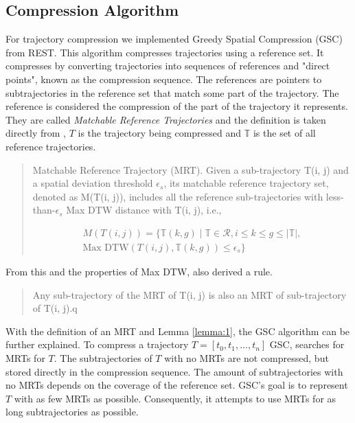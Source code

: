 \subsection{Compression Algorithm}
For trajectory compression we implemented Greedy Spatial Compression (GSC) from REST. This algorithm compresses trajectories using a reference set. It compresses by converting trajectories into sequences of references and "direct points", known as the compression sequence. The references are pointers to subtrajectories in the reference set that match some part of the trajectory. The reference is considered the compression of the part of the trajectory it represents. They are called \textit{Matchable Reference Trajectories} and the definition is taken directly from \textcite{zhao2018rest}, $T$ is the trajectory being compressed and $\mathbb{T}$ is the set of all reference trajectories.
\\
\begin{quote}
    \begin{definition}
        \label{def:mrt}
        Matchable Reference Trajectory (MRT). Given a sub-trajectory T(i, j) and a spatial deviation threshold $\epsilon_{s}$, its matchable reference trajectory set, denoted as M(T(i, j)), includes all the reference sub-trajectories with less-than-$\epsilon_{s}$ Max DTW distance with T(i, j), i.e.,
    \end{definition}
    \begin{equation}\label{eq:mrt}
        \begin{aligned}
            M(T(i,j)) = \{ \mathbb{T}(k,g) \mid \mathbb{T} \in \mathcal{R}, i \leq k \leq g \leq \left\lvert \mathbb{T} \right\rvert, \\
            \text{Max DTW}(T(i,j), \mathbb{T}(k,g)) \leq \epsilon_{s} \}
        \end{aligned}
    \end{equation}
\end{quote}

From this and the properties of Max DTW, \textcite{zhao2018rest} also derived a rule.

\begin{quote}
    \begin{lemma}\label{lemma:1}
        Any sub-trajectory of the MRT of T(i, j) is also an MRT of sub-trajectory of T(i, j).q
    \end{lemma}
\end{quote}


With the definition of an MRT and Lemma \ref{lemma:1}, the GSC algorithm can be further explained. To compress a trajectory $T = [t_0, t_1, ..., t_n]$ GSC, searches for MRTs for $T$. The subtrajectories of $T$ with no MRTs are not compressed, but stored directly in the compression sequence. The amount of subtrajectories with no MRTs depends on the coverage of the reference set. GSC's goal is to represent $T$ with as few MRTs as possible. Consequently, it attempts to use MRTs for as long subtrajectories as possible.


